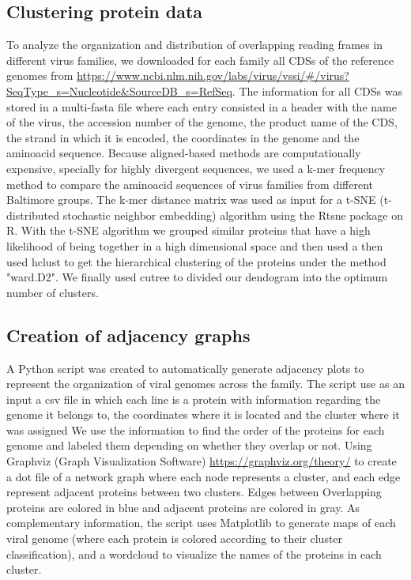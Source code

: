 \documentclass[12pt]{article}
\begin{document}
\subsection{Clustering protein data}
To analyze the organization and distribution of overlapping reading frames in different virus families, we downloaded for each family all CDSs of the reference genomes from \url{https://www.ncbi.nlm.nih.gov/labs/virus/vssi/#/virus?SeqType_s=Nucleotide&SourceDB_s=RefSeq}.
The information for all CDSs was stored in a multi-fasta file where each entry consisted in a header with the name of the virus, the accession number of the genome, the product name of the CDS, the strand in which it is encoded, the coordinates in the genome and the aminoacid sequence.
Because aligned-based methods are computationally expensive, specially for highly divergent sequences, we used a k-mer frequency method to compare the aminoacid sequences of virus families from different Baltimore groups.
The k-mer distance  matrix was used as input for a t-SNE (t-distributed stochastic neighbor embedding) algorithm using the Rtsne package on R. 
With the t-SNE algorithm we grouped similar proteins that have a high likelihood of being together in a high dimensional space and then used a then used hclust to get the hierarchical clustering of the proteins under the method "ward.D2".
We finally used cutree to divided our dendogram into the optimum number of clusters.

\subsection{Creation of adjacency graphs}
A Python script was created to automatically generate adjacency plots to represent the organization of viral genomes across the family. 
The script use as an input a csv file in which each line is a protein with information regarding the genome it belongs to, the coordinates where it is located and the cluster where it was assigned
We use the information to find the order of the proteins for each genome and labeled them depending on whether they overlap or not. 
Using Graphviz (Graph Visualization Software) \url{https://graphviz.org/theory/} to create a dot file of a network graph where each node represents a cluster, and each edge represent adjacent proteins between two clusters.
Edges between Overlapping proteins are colored in blue and adjacent proteins are colored in gray. 
As complementary information, the script uses Matplotlib\cite{Hunter:2007} to generate maps of each viral genome (where each protein is colored according to their cluster classification), and a wordcloud to visualize the names of the proteins in each cluster.
\end{document}
